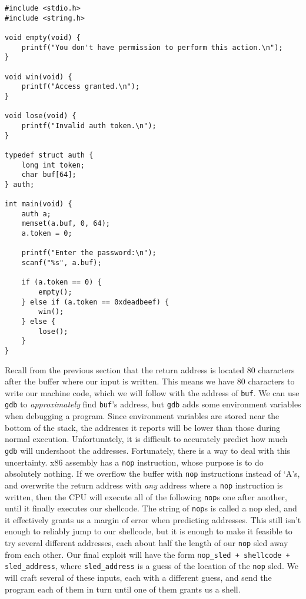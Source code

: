 \documentclass{article}
\begin{document}
\begin{lstlisting}
#include <stdio.h>
#include <string.h>

void empty(void) {
    printf("You don't have permission to perform this action.\n");
}

void win(void) {
    printf("Access granted.\n");
}

void lose(void) {
    printf("Invalid auth token.\n");
}

typedef struct auth {
    long int token;
    char buf[64];
} auth;

int main(void) {
    auth a;
    memset(a.buf, 0, 64);
    a.token = 0;

    printf("Enter the password:\n");
    scanf("%s", a.buf);

    if (a.token == 0) {
        empty();
    } else if (a.token == 0xdeadbeef) {
        win();
    } else {
        lose();
    }
}
\end{lstlisting}

Recall from the previous section that the return address is located 80
characters after the buffer where our input is written. This means we have 80
characters to write our machine code, which we will follow with the address of
\texttt{buf}. We can use \texttt{gdb} to \emph{approximately} find
\texttt{buf}'s address, but \texttt{gdb} adds some environment variables when
debugging a program. Since environment variables are stored near the bottom of
the stack, the addresses it reports will be lower than those during normal
execution. Unfortunately, it is difficult to accurately predict how much
\texttt{gdb} will undershoot the addresses. Fortunately, there is a way to deal
with this uncertainty. x86 assembly has a \texttt{nop} instruction, whose
purpose is to do absolutely nothing. If we overflow the buffer with \texttt{nop}
instructions instead of `A's, and overwrite the return address with \emph{any}
address where a \texttt{nop} instruction is written, then the CPU will execute
all of the following \texttt{nop}s one after another, until it finally executes
our shellcode. The string of \texttt{nop}s is called a nop sled, and it
effectively grants us a margin of error when predicting addresses. This still
isn't enough to reliably jump to our shellcode, but it is enough to make it
feasible to try several different addresses, each about half the length of our
\texttt{nop} sled away from each other. Our final exploit will have the form
\texttt{nop\_sled + shellcode + sled\_address}, where \texttt{sled\_address} is
a guess of the location of the \texttt{nop} sled. We will craft several of these
inputs, each with a different guess, and send the program each of them in turn
until one of them grants us a shell.
\end{document}
